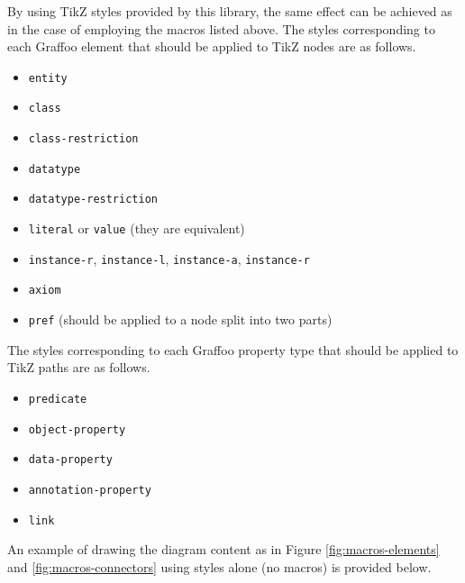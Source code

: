 By using TikZ styles provided by this library, the same effect can be achieved as in the case of employing the macros listed above. The styles corresponding to each Graffoo element that should be applied to TikZ nodes are as follows.

\begin{itemize}
	\item \texttt{entity}
	\item \texttt{class}
	\item \texttt{class-restriction}
	\item \texttt{datatype}
	\item \texttt{datatype-restriction}
	\item \texttt{literal} or \texttt{value} (they are equivalent)
	\item \texttt{instance-r}, \texttt{instance-l}, \texttt{instance-a}, \texttt{instance-r}
	\item \texttt{axiom}
	\item \texttt{pref} (should be applied to a node split into two parts)	
\end{itemize}

The styles corresponding to each Graffoo property type that should be applied to TikZ paths are as follows.

\begin{itemize}
	\item \texttt{predicate}
	\item \texttt{object-property}
	\item \texttt{data-property}
	\item \texttt{annotation-property}
	\item \texttt{link}	
\end{itemize}

An example of drawing the diagram content as in Figure \ref{fig:macros-elements} and \ref{fig:macros-connectors} using styles alone (no macros) is provided below. 

